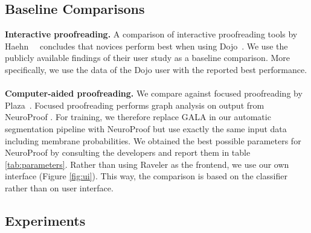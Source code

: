 \subsection{Baseline Comparisons}

\textbf{Interactive proofreading.} A comparison of interactive proofreading tools by Haehn~\etal~ concludes that novices perform best when using Dojo~\cite{haehn_dojo_2014}. We use the publicly available findings of their user study as a baseline comparison. More specifically, we use the data of the Dojo user with the reported best performance.
\\~\\
\textbf{Computer-aided proofreading.} We compare against focused proofreading by Plaza~\cite{focused_proofreading}. Focused proofreading performs graph analysis on output from NeuroProof \cite{neuroproof2013}. For training, we therefore replace GALA in our automatic segmentation pipeline with NeuroProof but use exactly the same input data including membrane probabilities. We obtained the best possible parameters for NeuroProof by consulting the developers and report them in table \ref{tab:parameters}. Rather than using Raveler as the frontend, we use our own interface (Figure \ref{fig:ui}). This way, the comparison is based on the classifier rather than on user interface.

\subsection{Experiments}

